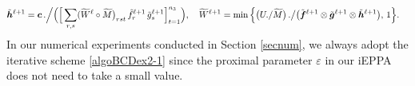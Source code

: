 \documentclass[10pt]{article}
\begin{document}
\begin{appendices}
\begin{equation}
\begin{aligned}
\\
\tilde{\bm{h}}^{\ell+1} &= \bm{c}\,.\Big{/}\Big(
\Big[\sum_{r,s} (\widetilde{W}^\ell\circ\widetilde{M}\big)_{rst} \,\tilde{f}_r^{\ell+1}\,\tilde{g}_s^{\ell+1} \Big]_{t=1}^{n_3}\Big), \quad
\widetilde{W}^{\ell+1} = \min\Big{\{}\big{(}U./\widetilde{M}\big{)}\,.\big{/}
\big{(}\tilde{\bm{f}}^{\ell+1}\otimes\tilde{\bm{g}}^{\ell+1}\otimes\tilde{\bm{h}}^{\ell+1}\big{)},
\,1\Big{\}}.
\end{aligned}
\end{equation}
In our numerical experiments conducted in Section \ref{secnum}, we always adopt the iterative scheme \eqref{algoBCDex2-1} since the proximal parameter $\varepsilon$ in our iEPPA does not need to take a small value.











\end{appendices}
\end{document}
